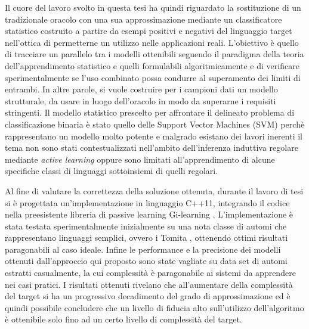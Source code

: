 Il cuore del lavoro svolto in questa tesi ha quindi riguardato la sostituzione di un tradizionale oracolo con una sua approssimazione mediante un classificatore statistico costruito a partire da esempi positivi e negativi del linguaggio target nell'ottica di permetterne un utilizzo nelle applicazioni reali. L'obiettivo è quello di tracciare un parallelo tra i modelli ottenibili seguendo il paradigma della teoria dell'apprendimento statistico e quelli formulabili algoritmicamente e di verificare sperimentalmente se l'uso combinato possa condurre al superamento dei limiti di entrambi. In altre parole, si vuole costruire per i campioni dati un modello strutturale, da usare in luogo dell'oracolo in modo da superarne i requisiti stringenti.  Il modello statistico prescelto per affrontare il delineato problema di classificazione binaria è stato quello delle Support Vector Machines (SVM) perchè rappresentano un modello molto potente e malgrado esistano dei lavori inerenti il tema non sono stati contestualizzati nell'ambito dell'inferenza induttiva regolare mediante \textit{active learning}  oppure sono limitati all’apprendimento di alcune specifiche classi di linguaggi sottoinsiemi di quelli regolari.


Al fine di valutare la correttezza della soluzione ottenuta, durante il lavoro di tesi si è progettata un'implementazione in linguaggio C++11, integrando il codice nella preesistente libreria di passive learning Gi-learning \cite{Cot16}. L'implementazione è stata testata sperimentalmente inizialmente su una nota classe di automi che rappresentano linguaggi semplici, ovvero i Tomita \cite{Tomita82, Dupont94}, ottenendo ottimi risultati paragonabili al caso ideale.
Infine le performance e la precisione dei modelli ottenuti dall'approccio qui proposto sono state vagliate su data set di automi estratti casualmente, la cui complessità è paragonabile ai sistemi da apprendere nei casi pratici. I risultati ottenuti rivelano che all'aumentare della complessità del target si ha un progressivo decadimento del grado di approssimazione ed è quindi possibile concludere che un livello di fiducia alto sull'utilizzo dell'algoritmo è ottenibile solo fino ad un certo livello di complessità del target.


